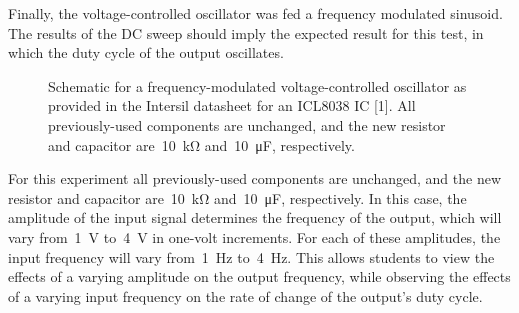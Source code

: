 Finally, the voltage-controlled oscillator was fed a frequency modulated
sinusoid.  The results of the DC sweep should imply the expected result for
this test, in which the duty cycle of the output oscillates.
%
\begin{figure}[H]
	\centering
	
	\parbox{.6\textwidth}{
	\caption{Schematic for a frequency-modulated voltage-controlled oscillator
	as provided in the Intersil datasheet for an ICL8038 IC [1].  All
	previously-used components are unchanged, and the new resistor and
	capacitor are~\SI{10}{\kilo\ohm} and~\SI{10}{\micro\farad}, respectively.}
	\label{fig:freq_mod}}
\end{figure}
%
For this experiment all previously-used components are unchanged, and the new
resistor and capacitor are~\SI{10}{\kilo\ohm} and~\SI{10}{\micro\farad},
respectively.  In this case, the amplitude of the input signal determines the
frequency of the output, which will vary from~\SI{1}{\volt} to~\SI{4}{\volt} in
one-volt increments.  For each of these amplitudes, the input frequency will
vary from~\SI{1}{\hertz} to~\SI{4}{\hertz}.  This allows students to view the
effects of a varying amplitude on the output frequency, while observing the
effects of a varying input frequency on the rate of change of the output's duty
cycle.

\begin{figure}[H]
	\centering
	
\end{figure}
